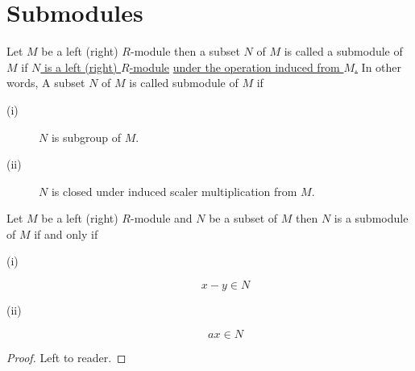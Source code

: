\section{Submodules}
\begin{definition}[SubModule]
	Let $M$ be a left (right) $R$-module then a subset $N$ of $M$ is called a submodule of $M$ if \underline{$N$ is a left (right) $R$-module} \underline{under the operation induced from $M$.}\newline \bigskip
	In other words, A subset $N$ of $M$ is called submodule of $M$ if
	\begin{description}
		\item[(i)] $N$ is subgroup of $M$.
		\item[(ii)] $N$ is closed under induced scaler multiplication from $M$.
	\end{description}
\end{definition}
\bigskip
\begin{thm}
	Let $M$ be a left (right) $R$-module and $N$ be a subset of $M$ then $N$ is a submodule of $M$ if and only if 
	\begin{description}
		\item[(i)] 
		\marginnote[2.5em]{\[ \forall \ x , y  \in N \] } \[ x-y \in N \]
		\item[(ii)] 
		\marginnote[2.5em]{\[ \forall \ a \in R \ \&\ x \in N \]} \[ a x \in N \]
	\end{description}
\end{thm}
\begin{proof}
	Left to reader.
\end{proof}
\bigskip
